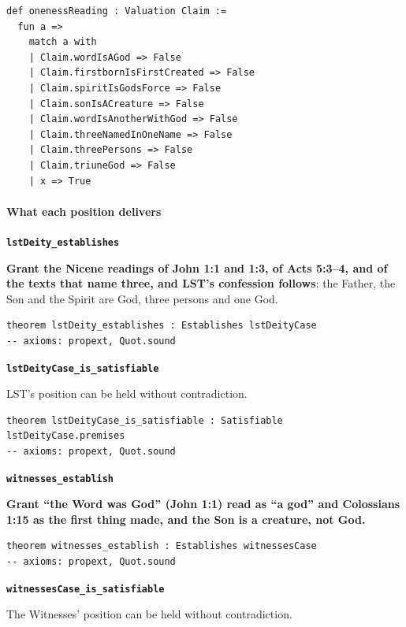 \documentclass[11pt,paper=\testimonypaper,DIV=13,parskip=false]{scrartcl}
\begin{document}
{\small\begin{verbatim}
def onenessReading : Valuation Claim :=
  fun a =>
    match a with
    | Claim.wordIsAGod => False
    | Claim.firstbornIsFirstCreated => False
    | Claim.spiritIsGodsForce => False
    | Claim.sonIsACreature => False
    | Claim.wordIsAnotherWithGod => False
    | Claim.threeNamedInOneName => False
    | Claim.threePersons => False
    | Claim.triuneGod => False
    | x => True
\end{verbatim}}
\paragraph*{What each position delivers}
\leavevmode\par\nobreak
\par\medskip\noindent\textbf{\texttt{lst\allowbreak{}Deity\_\allowbreak{}establishes}}\par\nobreak\noindent
\textbf{Grant the Nicene readings of John 1:1 and 1:3, of Acts 5:3–4, and of the texts that name three, and LST’s confession follows}: the Father, the Son and the Spirit are God, three persons and one God.

{\small\begin{verbatim}
theorem lstDeity_establishes : Establishes lstDeityCase
-- axioms: propext, Quot.sound
\end{verbatim}}
\par\medskip\noindent\textbf{\texttt{lst\allowbreak{}Deity\allowbreak{}Case\_\allowbreak{}is\_\allowbreak{}satisfiable}}\par\nobreak\noindent
LST’s position can be held without contradiction.

{\small\begin{verbatim}
theorem lstDeityCase_is_satisfiable : Satisfiable lstDeityCase.premises
-- axioms: propext, Quot.sound
\end{verbatim}}
\par\medskip\noindent\textbf{\texttt{witnesses\_\allowbreak{}establish}}\par\nobreak\noindent
\textbf{Grant “the Word was God” (John 1:1) read as “a god” and Colossians 1:15 as the first thing made, and the Son is a creature, not God.}

{\small\begin{verbatim}
theorem witnesses_establish : Establishes witnessesCase
-- axioms: propext, Quot.sound
\end{verbatim}}
\par\medskip\noindent\textbf{\texttt{witnesses\allowbreak{}Case\_\allowbreak{}is\_\allowbreak{}satisfiable}}\par\nobreak\noindent
The Witnesses’ position can be held without contradiction.
\end{document}
